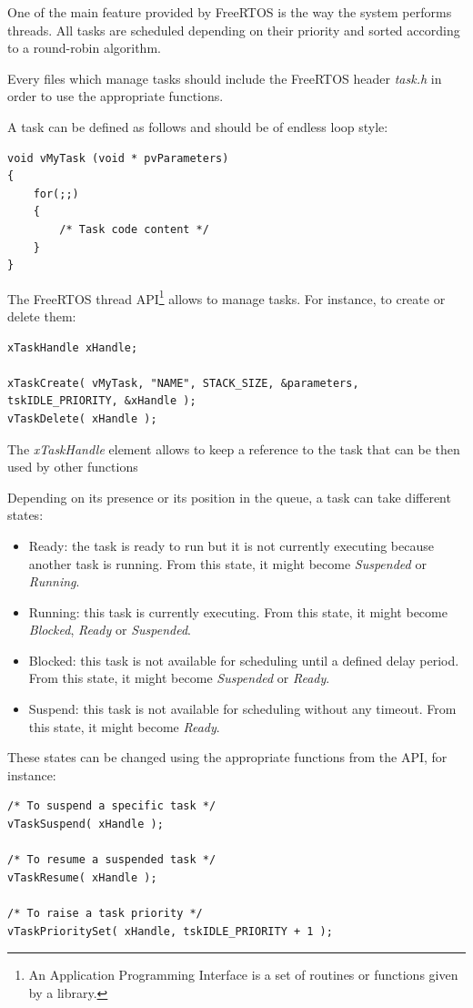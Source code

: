 \hspace{15mm}One of the main feature provided by FreeRTOS is the way the system performs threads. All tasks are scheduled depending on their priority and sorted according to a round-robin algorithm.

Every files which manage tasks should include the FreeRTOS header \textit{task.h} in order to use the appropriate functions.

A task can be defined as follows and should be of endless loop style:\clearpage
\begin{lstlisting}
void vMyTask (void * pvParameters)
{
	for(;;)
	{
		/* Task code content */
	}
}
\end{lstlisting}

The FreeRTOS thread API\footnote{An Application Programming Interface is a set of routines or functions given by a library.} allows to manage tasks. For instance, to create or delete them:
\begin{lstlisting}
xTaskHandle xHandle;

xTaskCreate( vMyTask, "NAME", STACK_SIZE, &parameters, tskIDLE_PRIORITY, &xHandle );
vTaskDelete( xHandle );
\end{lstlisting}
The \textit{xTaskHandle} element allows to keep a reference to the task that can be then used by other functions

Depending on its presence or its position in the queue, a task can take different states:
\begin{itemize}
\item Ready: the task is ready to run but it is not currently executing because another task is running. From this state, it might become \textit{Suspended} or \textit{Running}.
\item Running: this task is currently executing. From this state, it might become \textit{Blocked}, \textit{Ready} or \textit{Suspended}.
\item Blocked: this task is not available for scheduling until a defined delay period. From this state, it might become \textit{Suspended} or \textit{Ready}.
\item Suspend: this task is not available for scheduling without any timeout. From this state, it might become \textit{Ready}.
\end{itemize}
These states can be changed using the appropriate functions from the API, for instance:
\begin{lstlisting}
/* To suspend a specific task */
vTaskSuspend( xHandle );

/* To resume a suspended task */
vTaskResume( xHandle );

/* To raise a task priority */
vTaskPrioritySet( xHandle, tskIDLE_PRIORITY + 1 );
\end{lstlisting}


